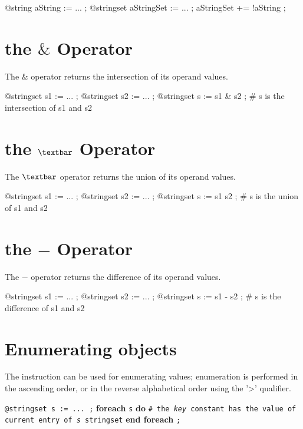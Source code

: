 \exempleTroisLignes
{}
{@string aString := ... ;}
{@stringset aStringSet := ... ;}
{aStringSet += !aString ;}




\section{the \emph{$\&$} Operator}

The \emph{$\&$} operator returns the intersection of its operand values.

\exempleTroisLignes
{}
{@stringset s1 := ... ;}
{@stringset s2 := ... ;}
{@stringset s := s1 \& s2 ; \# s is the intersection of s1 and s2}






\section{the \emph{$\textbar$} Operator}

The \emph{$\textbar$} operator returns the union of its operand values.

\exempleTroisLignes
{}
{@stringset s1 := ... ;}
{@stringset s2 := ... ;}
{@stringset s := s1 \textbar s2 ; \# s is the union of s1 and s2}






\section{the \emph{$-$} Operator}

The \emph{$-$} operator returns the difference of its operand values.

\exempleTroisLignes
{}
{@stringset s1 := ... ;}
{@stringset s2 := ... ;}
{@stringset s := s1 - s2 ; \# s is the difference of s1 and s2}








\section{Enumerating  objects}


The  instruction can be used for enumerating  values; enumeration is performed in the ascending order, or in the reverse alphabetical order using the '>' qualifier.

\texttt{@stringset s := ... ;}\newline
\textbf{foreach} \texttt {s} \textbf {do}\newline
\texttt{\# the \emph{key} constant has the value of current entry of \emph{s} stringset}\newline
\textbf{end foreach} \texttt{;}







